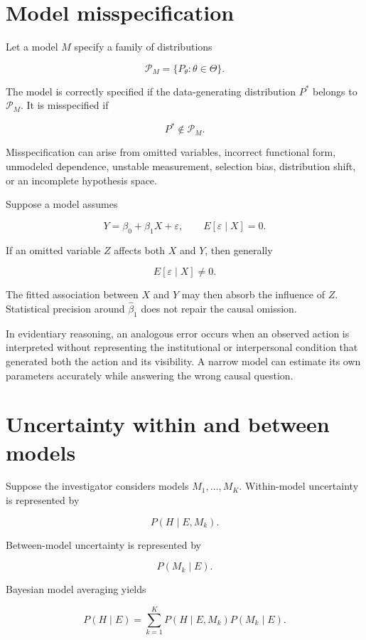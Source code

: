 \section{Model misspecification}
\label{sec:a14}

Let a model \(M\) specify a family of distributions

\[
\mathcal P_M=\{P_\theta:\theta\in\Theta\}.
\]

The model is correctly specified if the data-generating distribution \(P^\ast\) belongs to \(\mathcal P_M\). It is misspecified if

\[
P^\ast\notin\mathcal P_M.
\]

Misspecification can arise from omitted variables, incorrect functional form, unmodeled dependence, unstable measurement, selection bias, distribution shift, or an incomplete hypothesis space.

Suppose a model assumes

\[
Y=\beta_0+\beta_1X+\varepsilon,
\qquad
E[\varepsilon\mid X]=0.
\]

If an omitted variable \(Z\) affects both \(X\) and \(Y\), then generally

\[
E[\varepsilon\mid X]\neq0.
\]

The fitted association between \(X\) and \(Y\) may then absorb the influence of \(Z\). Statistical precision around \(\widehat\beta_1\) does not repair the causal omission.

In evidentiary reasoning, an analogous error occurs when an observed action is interpreted without representing the institutional or interpersonal condition that generated both the action and its visibility. A narrow model can estimate its own parameters accurately while answering the wrong causal question.

\section{Uncertainty within and between models}
\label{sec:a15}

Suppose the investigator considers models \(M_1,\ldots,M_K\). Within-model uncertainty is represented by

\[
P(H\mid E,M_k).
\]

Between-model uncertainty is represented by

\[
P(M_k\mid E).
\]

Bayesian model averaging yields

\[
P(H\mid E)
=
\sum_{k=1}^{K}
P(H\mid E,M_k)P(M_k\mid E).
\]

